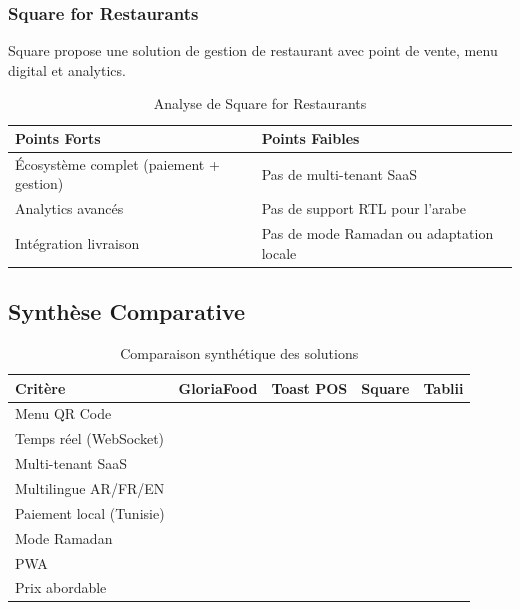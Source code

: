 \documentclass[12pt,a4paper]{report}
\newcommand{\checkmarkitem}{\ding{51}}
\newcommand{\crossitem}{\ding{55}}
\newcommand{\cmark}{\textcolor{accent}{\checkmarkitem}}
\newcommand{\xmark}{\textcolor{primary}{\crossitem}}
\begin{document}
\subsubsection{Square for Restaurants}

Square propose une solution de gestion de restaurant avec point de vente, menu digital et analytics.

\begin{table}[H]
    \centering
    \begin{tabularx}{\textwidth}{l X}
        \toprule
        \rowcolor{accent!10}
        \textbf{Points Forts} & \textbf{Points Faibles} \\
        \midrule
        Écosystème complet (paiement + gestion) & Pas de multi-tenant SaaS \\
        Analytics avancés & Pas de support RTL pour l'arabe \\
        Intégration livraison & Pas de mode Ramadan ou adaptation locale \\
        \bottomrule
    \end{tabularx}
    \caption{Analyse de Square for Restaurants}
    \label{tab:square}
\end{table}

\subsection{Synthèse Comparative}

\begin{table}[H]
    \centering
    \begin{tabularx}{\textwidth}{l c c c c}
        \toprule
        \rowcolor{primary!10}
        \textbf{Critère} & \textbf{GloriaFood} & \textbf{Toast POS} & \textbf{Square} & \textbf{Tablii} \\
        \midrule
        Menu QR Code & \cmark & \cmark & \cmark & \cmark \\
        Temps réel (WebSocket) & \xmark & \cmark & \cmark & \cmark \\
        Multi-tenant SaaS & \cmark & \xmark & \xmark & \cmark \\
        Multilingue AR/FR/EN & \xmark & \xmark & \xmark & \cmark \\
        Paiement local (Tunisie) & \xmark & \xmark & \xmark & \cmark \\
        Mode Ramadan & \xmark & \xmark & \xmark & \cmark \\
        PWA & \xmark & \xmark & \xmark & \cmark \\
        Prix abordable & \cmark & \xmark & \xmark & \cmark \\
        \bottomrule
    \end{tabularx}
    \caption{Comparaison synthétique des solutions}
    \label{tab:comparison}
\end{table}
\end{document}
